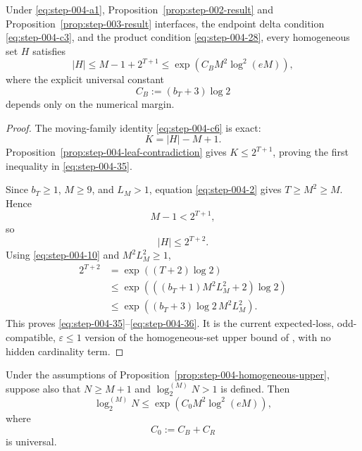 \begin{proposition}
\label{prop:step-004-homogeneous-upper}

Under \eqref{eq:step-004-a1}, Proposition~\ref{prop:step-002-result} and Proposition~\ref{prop:step-003-result} interfaces, the endpoint delta condition \eqref{eq:step-004-c3}, and the product condition \eqref{eq:step-004-28}, every homogeneous set \(H\) satisfies
\[
|H|\le M-1+2^{T+1}
\le\exp\!\left(C_BM^2\log^2(eM)\right),
\tag{35}\label{eq:step-004-35}
\]
where the explicit universal constant
\[
C_B:=(b_T+3)\log2
\tag{36}\label{eq:step-004-36}
\]
depends only on the numerical margin.

\end{proposition}

\begin{proof}

The moving-family identity \eqref{eq:step-004-c6} is exact:
\[
K=|H|-M+1.
\tag{37}\label{eq:step-004-37}
\]
Proposition~\ref{prop:step-004-leaf-contradiction} gives \(K\le 2^{T+1}\), proving the first inequality in \eqref{eq:step-004-35}.

Since \(b_T\ge 1\), \(M\ge 9\), and \(L_M>1\), equation \eqref{eq:step-004-2} gives \(T\ge M^2\ge M\). Hence
\[
M-1<2^{T+1},
\]
so
\[
|H|\le2^{T+2}.
\tag{38}\label{eq:step-004-38}
\]
Using \eqref{eq:step-004-10} and \(M^2L_M^2\ge 1\),
\[
\begin{aligned}
2^{T+2}
&=\exp((T+2)\log2)\\
&\le\exp\!\left(((b_T+1)M^2L_M^2+2)\log2\right)\\
&\le\exp\!\left((b_T+3)\log2\,M^2L_M^2\right).
\end{aligned}
\tag{39}\label{eq:step-004-39}
\]
This proves \eqref{eq:step-004-35}--\eqref{eq:step-004-36}. It is the current expected-loss, odd-compatible, \(\varepsilon\le 1\) version of the homogeneous-set upper bound of \citet{alonEtAl2018private}, with no hidden cardinality term.

\end{proof}


\begin{proposition}
\label{prop:step-004-ramsey-comparison}

Under the assumptions of Proposition~\ref{prop:step-004-homogeneous-upper}, suppose also that \(N\ge M+1\) and \(\log_2^{(M)}N>1\) is defined. Then
\[
\log_2^{(M)}N
\le\exp\!\left(C_0M^2\log^2(eM)\right),
\tag{40}\label{eq:step-004-40}
\]
where
\[
C_0:=C_B+C_R
\tag{41}\label{eq:step-004-41}
\]
is universal.

\end{proposition}

